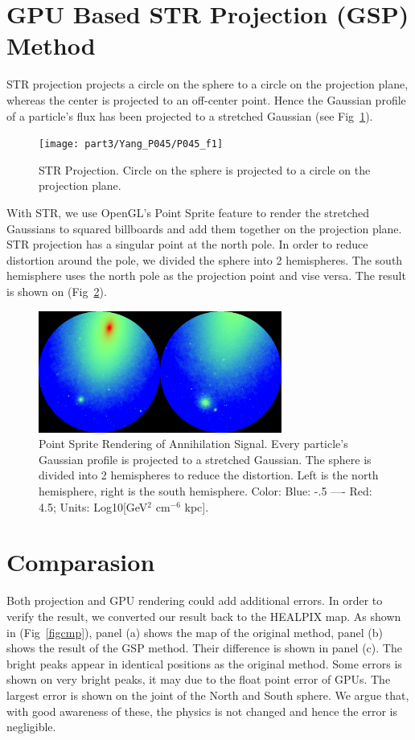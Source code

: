 \section{GPU Based STR Projection (GSP) Method}
STR projection projects a circle on the sphere to a circle on the projection plane, whereas the center is projected to an off-center point. Hence the Gaussian profile of a particle's flux has been projected to a stretched Gaussian (see Fig~\ref{figstr}). 

\begin{figure}[htb]
\begin{center}
 \texttt{[image: part3/Yang\_P045/P045\_f1]}
\caption{STR Projection. Circle on the sphere is projected to a circle on the projection plane.\label{figstr}}
\end{center}
\end{figure}

With STR, we use OpenGL's Point Sprite feature to render the stretched Gaussians to squared billboards and add them together on the projection plane. STR projection has a singular point at the north pole. In order to reduce distortion around the pole, we divided the  sphere into 2 hemispheres. The south hemisphere uses the north pole as the projection point and vise versa. The result is shown on (Fig~\ref{figsky}).

\begin{figure}[htb]
\begin{center}
 \includegraphics[width=80mm]{part3/Yang_P045/P045_f2}
\caption{ Point Sprite Rendering of Annihilation Signal. Every particle's Gaussian profile is projected to a stretched Gaussian. The sphere is divided into 2 hemispheres to reduce the distortion. Left is the north hemisphere, right is the south hemisphere. Color: Blue: -.5 ---- Red: 4.5;  Units: Log10[GeV$^2$ cm$^{-6}$ kpc].\label{figsky}}
\end{center}
\end{figure}

\section{Comparasion}
Both projection and GPU rendering could add additional errors. In order to verify the result, we converted our result back to the HEALPIX map. As shown in (Fig~\ref{figcmp}), panel (a) shows the map of the original method, panel (b) shows the result of the GSP method. Their difference is shown in panel (c). The bright peaks appear in identical positions as the original method. Some errors is shown on very bright peaks, it may due to the float point error of GPUs. The largest error is shown on the joint of the North and South sphere. We argue that, with good awareness of these, the physics is not changed and hence the error is negligible. 

